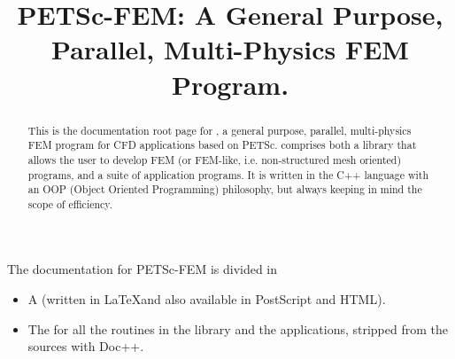 \documentclass[11pt]{article}
\begin{document}
\sloppy

\title{PETSc-FEM: A General Purpose, Parallel, Multi-Physics FEM Program.}
\maketitle

\begin{abstract}
This is the documentation root page for \pfem, a general purpose, parallel,
multi-physics FEM program for CFD applications based on
PETSc. \pfem{} comprises both a library that allows the user to
develop FEM (or FEM-like, i.e. non-structured mesh oriented) programs, and
a suite of application programs. It is written in the C++ language
with an OOP (Object Oriented Programming) philosophy, but always
keeping in mind the scope of efficiency. 
\end{abstract}

The documentation for PETSc-FEM is divided in 

\begin{itemize}
\item A  (written
in \LaTeX and also available in PostScript and HTML).

\item The  for all the routines in the
library and the applications, stripped from the sources with Doc++.
\end{itemize}
\end{document}
